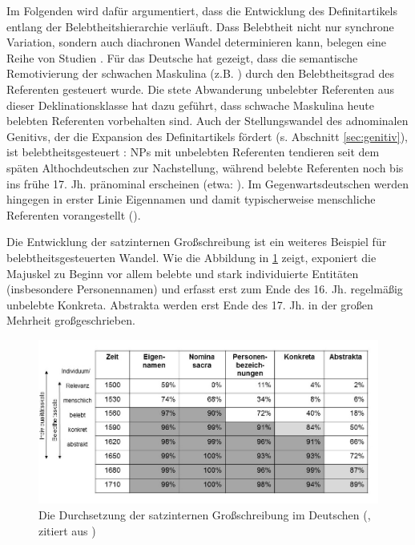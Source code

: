 Im Folgenden wird dafür argumentiert, dass die Entwicklung des Definitartikels entlang der Belebtheitshierarchie verläuft. Dass Belebtheit nicht nur synchrone Variation, sondern auch diachronen Wandel determinieren kann, belegen eine Reihe von Studien \parencite[vgl. die Übersicht in][]{Enger2011}. Für das Deutsche hat \textcite{Kopcke1995, Kopcke2000a,Kopcke2000,Kopcke2005} gezeigt, dass die semantische Remotivierung der schwachen Maskulina (z.B. )  durch den  Belebtheitsgrad des Referenten gesteuert wurde. Die stete Abwanderung unbelebter Referenten aus dieser Deklinationsklasse hat dazu geführt, dass schwache Maskulina heute belebten Referenten vorbehalten sind. 
Auch der Stellungswandel des adnominalen Genitivs, der die Expansion des Definitartikels fördert (s. Abschnitt  \ref{sec:genitiv}), ist belebtheitsgesteuert \parencite[215-223]{Demske2001}: NPs mit unbelebten Referenten tendieren seit dem späten Althochdeutschen zur Nachstellung, während belebte Referenten noch bis ins frühe 17. Jh. pränominal erscheinen (etwa: ). Im Gegenwartsdeutschen werden hingegen in erster Linie Eigennamen und damit typischerweise menschliche Referenten vorangestellt  ().   

Die Entwicklung der satzinternen Großschreibung \parencite{Bergmann1998,Bergmann1998a,Bergmann1999,Szczepaniak2011,Szczepaniak2016} ist ein weiteres Beispiel für belebtheitsgesteuerten Wandel. Wie die Abbildung in \ref{sgs} zeigt, exponiert die Majuskel zu Beginn vor allem belebte und stark individuierte Entitäten (insbesondere Personennamen) und erfasst erst zum Ende des 16. Jh. regelmäßig unbelebte Konkreta. Abstrakta werden erst Ende des 17. Jh. in der großen Mehrheit großgeschrieben.   

\begin{figure}
\begin{center}
\includegraphics[width=12cm]{images/SGS-bergmann-szczepaniak-neu.jpg}
\caption {Die Durchsetzung der satzinternen Großschreibung im Deutschen (\cite{Bergmann1999}, zitiert aus \cite[351]{Szczepaniak2011})}
\label{sgs}
\end{center}
\end{figure} 

